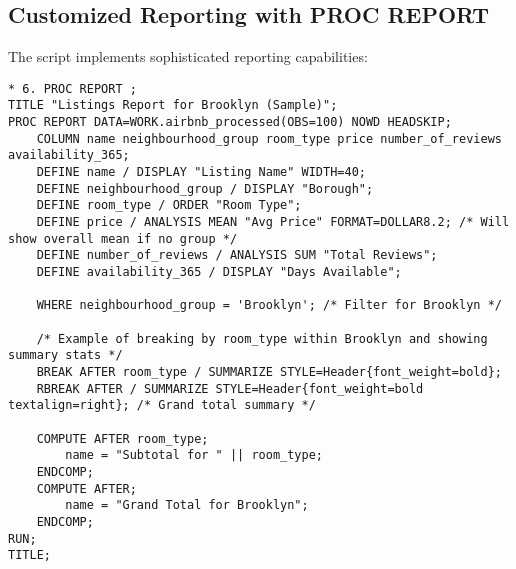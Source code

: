 \documentclass{article}
\begin{document}
\subsection{Customized Reporting with PROC REPORT}
The script implements sophisticated reporting capabilities:

\begin{lstlisting}[style=SASStyle, caption=Customized Reporting Implementation]
* 6. PROC REPORT ;
TITLE "Listings Report for Brooklyn (Sample)";
PROC REPORT DATA=WORK.airbnb_processed(OBS=100) NOWD HEADSKIP;
    COLUMN name neighbourhood_group room_type price number_of_reviews availability_365;
    DEFINE name / DISPLAY "Listing Name" WIDTH=40;
    DEFINE neighbourhood_group / DISPLAY "Borough";
    DEFINE room_type / ORDER "Room Type";
    DEFINE price / ANALYSIS MEAN "Avg Price" FORMAT=DOLLAR8.2; /* Will show overall mean if no group */
    DEFINE number_of_reviews / ANALYSIS SUM "Total Reviews";
    DEFINE availability_365 / DISPLAY "Days Available";

    WHERE neighbourhood_group = 'Brooklyn'; /* Filter for Brooklyn */

    /* Example of breaking by room_type within Brooklyn and showing summary stats */
    BREAK AFTER room_type / SUMMARIZE STYLE=Header{font_weight=bold};
    RBREAK AFTER / SUMMARIZE STYLE=Header{font_weight=bold textalign=right}; /* Grand total summary */

    COMPUTE AFTER room_type;
        name = "Subtotal for " || room_type;
    ENDCOMP;
    COMPUTE AFTER;
        name = "Grand Total for Brooklyn";
    ENDCOMP;
RUN;
TITLE;
\end{lstlisting}
\end{document}
